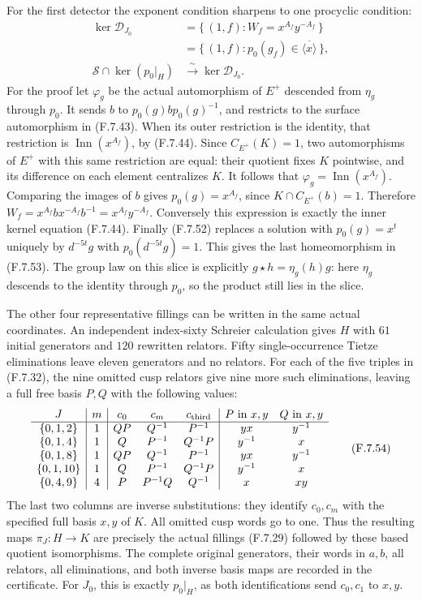 For the first detector the exponent condition
sharpens to one procyclic condition:
\[
 \begin{split}
 \ker\mathcal D_{J_0}
   &=\{\, (1,f):W_f=x^{A_f}y^{-A_f}\,\}\\
   &=\{\, (1,f):p_0(g_f)\in
                            \overline{\langle x\rangle}\,\},\\
 \mathscr S\cap\ker(p_0|_H)
   &\xrightarrow{\ \sim\ }\ker\mathcal D_{J_0}.
 \end{split}                                                   \tag{F.7.53}
\]
For the proof let $\varphi_g$ be the actual
automorphism of $E^+$ descended from $\eta_g$
through $p_0$.  It sends $b$ to
$p_0(g)b p_0(g)^{-1}$, and restricts to the
surface automorphism in (F.7.43).
When its outer restriction is the identity,
that restriction is $\operatorname{Inn}(x^{A_f})$,
by (F.7.44).  Since $C_{E^+}(K)=1$, two
automorphisms of $E^+$ with this same restriction
are equal: their quotient fixes $K$ pointwise,
and its difference on each element centralizes
$K$.  It follows that
$\varphi_g=\operatorname{Inn}(x^{A_f})$.
Comparing the images of $b$ gives
$p_0(g)=x^{A_f}$, since
$K\cap C_{E^+}(b)=1$.
Therefore
$W_f=x^{A_f}b x^{-A_f}b^{-1}=x^{A_f}y^{-A_f}$.
Conversely this expression is exactly the inner
kernel equation (F.7.44).
Finally (F.7.52) replaces a solution with
$p_0(g)=x^t$ uniquely by $d^{-5t}g$ with
$p_0(d^{-5t}g)=1$.  This gives the last
homeomorphism in (F.7.53).
The group law on this slice is explicitly
$g\star h=\eta_g(h)g$: here $\eta_g$ descends
to the identity through $p_0$, so the product
still lies in the slice.

The other four representative fillings can be
written in the same actual coordinates.
An independent index-sixty Schreier calculation
gives $H$ with $61$ initial generators and
$120$ rewritten relators.  Fifty single-occurrence
Tietze eliminations leave eleven generators and
no relators.  For each of the five triples in
(F.7.32), the nine omitted cusp relators give
nine more such eliminations, leaving a full
free basis $P,Q$ with the following values:
\[
 \begin{array}{c|c|ccc|cc}
 J&m&c_0&c_m&c_{\rm third}&P\text{ in }x,y&Q\text{ in }x,y\\ \hline
 \{0,1,2\}&1&QP&Q^{-1}&P^{-1}&yx&y^{-1}\\
 \{0,1,4\}&1&Q&P^{-1}&Q^{-1}P&y^{-1}&x\\
 \{0,1,8\}&1&QP&Q^{-1}&P^{-1}&yx&y^{-1}\\
 \{0,1,10\}&1&Q&P^{-1}&Q^{-1}P&y^{-1}&x\\
 \{0,4,9\}&4&P&P^{-1}Q&Q^{-1}&x&xy
 \end{array}                                                   \tag{F.7.54}
\]
The last two columns are inverse substitutions:
they identify $c_0,c_m$ with the specified full
basis $x,y$ of $K$.
All omitted cusp words go to one.
Thus the resulting maps
$\pi_J:H\to K$ are precisely the actual fillings
(F.7.29) followed by these based quotient
isomorphisms.  The complete original generators,
their words in $a,b$, all relators, all
eliminations, and both inverse basis maps
are recorded in the certificate.
For $J_0$, this is exactly $p_0|_H$,
as both identifications send $c_0,c_1$ to $x,y$.

